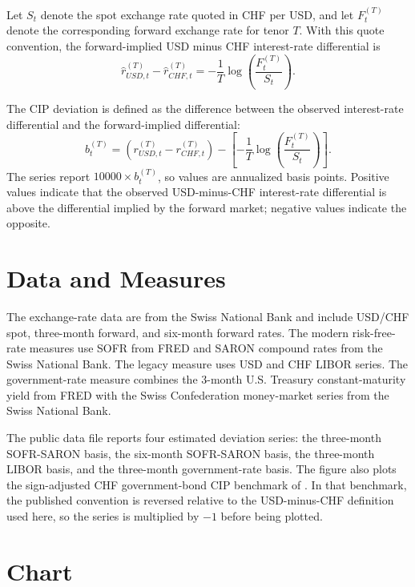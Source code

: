 \documentclass[12pt,a4paper]{article}
\begin{document}
Let \(S_t\) denote the spot exchange rate quoted in CHF per USD, and let \(F_t^{(T)}\) denote the corresponding forward exchange rate for tenor \(T\). With this quote convention, the forward-implied USD minus CHF interest-rate differential is
\begin{equation}
    \widehat{r}_{USD,t}^{(T)} - \widehat{r}_{CHF,t}^{(T)} = -\frac{1}{T}\log\left(\frac{F_t^{(T)}}{S_t}\right).
\end{equation}

The CIP deviation is defined as the difference between the observed interest-rate differential and the forward-implied differential:
\begin{equation}
    b_t^{(T)} = \left(r_{USD,t}^{(T)} - r_{CHF,t}^{(T)}\right)
    - \left[-\frac{1}{T}\log\left(\frac{F_t^{(T)}}{S_t}\right)\right].
\end{equation}
The series report \(10000 \times b_t^{(T)}\), so values are annualized basis points. Positive values indicate that the observed USD-minus-CHF interest-rate differential is above the differential implied by the forward market; negative values indicate the opposite.

\section{Data and Measures}

The exchange-rate data are from the Swiss National Bank and include USD/CHF spot, three-month forward, and six-month forward rates. The modern risk-free-rate measures use SOFR from FRED and SARON compound rates from the Swiss National Bank. The legacy measure uses USD and CHF LIBOR series. The government-rate measure combines the 3-month U.S. Treasury constant-maturity yield from FRED with the Swiss Confederation money-market series from the Swiss National Bank.

The public data file reports four estimated deviation series: the three-month SOFR-SARON basis, the six-month SOFR-SARON basis, the three-month LIBOR basis, and the three-month government-rate basis. The figure also plots the sign-adjusted CHF government-bond CIP benchmark of \citet{DuKeeratiSchreger}. In that benchmark, the published convention is reversed relative to the USD-minus-CHF definition used here, so the series is multiplied by \(-1\) before being plotted.

\section{Chart}
\end{document}
